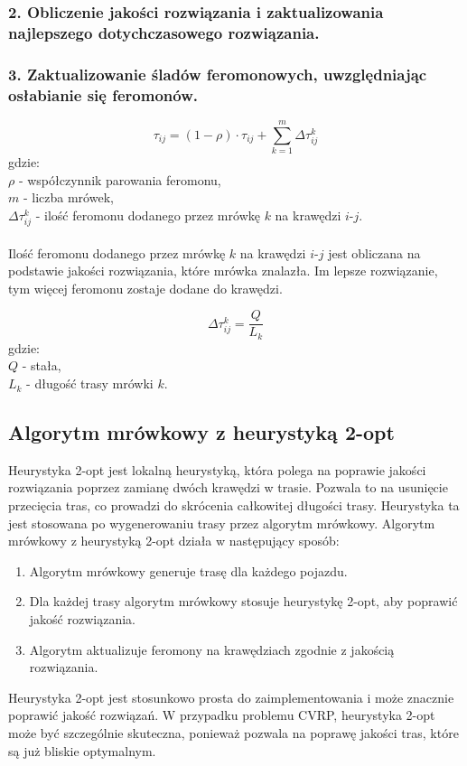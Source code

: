 \documentclass{article}
\begin{document}
\subsubsection*{2. Obliczenie jakości rozwiązania i zaktualizowania najlepszego dotychczasowego rozwiązania.}

\subsubsection*{3. Zaktualizowanie śladów feromonowych, uwzględniając osłabianie się feromonów.}

\begin{equation}
    \tau_{ij} = (1 - \rho) \cdot \tau_{ij} + \sum_{k=1}^{m} \Delta\tau_{ij}^k
\end{equation}
gdzie:
\\
$\rho$ - współczynnik parowania feromonu, 
\\
$m$ - liczba mrówek, 
\\
$\Delta\tau_{ij}^k$ - ilość feromonu dodanego przez mrówkę $k$ na krawędzi $i$-$j$.
\\ \\
Ilość feromonu dodanego przez mrówkę $k$ na krawędzi $i$-$j$ jest obliczana na podstawie jakości rozwiązania, które mrówka znalazła. Im lepsze rozwiązanie, tym więcej feromonu zostaje dodane do krawędzi.

\begin{equation}
    \Delta\tau_{ij}^k = \frac{Q}{L_k}
\end{equation}
gdzie:
\\
$Q$ - stała,
\\
$L_k$ - długość trasy mrówki $k$.


\subsection{Algorytm mrówkowy z heurystyką 2-opt}
Heurystyka 2-opt jest lokalną heurystyką, która polega na poprawie jakości rozwiązania poprzez zamianę dwóch krawędzi w trasie. Pozwala to na usunięcie przecięcia tras, co prowadzi do skrócenia całkowitej długości trasy. Heurystyka ta jest stosowana po wygenerowaniu trasy przez algorytm mrówkowy. Algorytm mrówkowy z heurystyką 2-opt działa w następujący sposób:
\begin{enumerate}
    \item Algorytm mrówkowy generuje trasę dla każdego pojazdu.
    \item Dla każdej trasy algorytm mrówkowy stosuje heurystykę 2-opt, aby poprawić jakość rozwiązania.
    \item Algorytm aktualizuje feromony na krawędziach zgodnie z jakością rozwiązania.
\end{enumerate}
Heurystyka 2-opt jest stosunkowo prosta do zaimplementowania i może znacznie poprawić jakość rozwiązań. W przypadku problemu CVRP, heurystyka 2-opt może być szczególnie skuteczna, ponieważ pozwala na poprawę jakości tras, które są już bliskie optymalnym.
\end{document}
